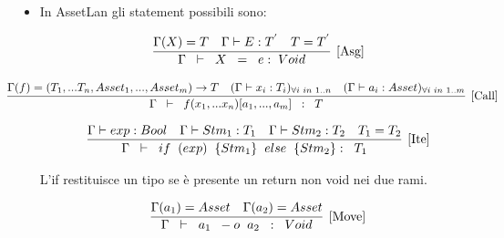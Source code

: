 \documentclass[12pt,twoside,openright,a4paper]{report}
\begin{document}
\begin{itemize}
    \item In AssetLan gli statement possibili sono:
    
    \begin{align*}
    \infer[\mathrm{[Asg]}]
    {\Gamma  \hspace{0.2cm} \vdash \hspace{0.2cm} X \hspace{0.2cm} = \hspace{0.2cm}  e : \hspace{0.1cm} Void} 
    {  \Gamma (X) = T & \Gamma \vdash E : T^{'} & T= T^{'} }
    \end{align*}

    \begin{align*}
    \hspace{-1cm}
    \infer[\mathrm{[Call]}]
    {   
    \Gamma  \hspace{0.2cm} \vdash \hspace{0.2cm} f(x_{1}, ...x_{n})[a_{1}, ..., a_{m}] \hspace{0.2cm} : \hspace{0.2cm} T} 
    {  \Gamma (f) = (T_{1},...T_{n},Asset_{1},...,Asset_{m}) \to T  & (\Gamma \vdash x_{i} : T_{i})_{\forall{i \hspace{0.1cm}in \hspace{0.1cm} 1..n}} & (\Gamma \vdash a_{i} : Asset)_{\forall{i \hspace{0.1cm} in  \hspace{0.1cm}1..m}}}
    \end{align*}
  
    \begin{align*}
    \infer[\mathrm{[Ite]}]
    {\Gamma \hspace{0.2cm} \vdash  \hspace{0.2cm}if\hspace{0.2cm} (exp)\hspace{0.2cm} \{Stm_{1}\}\hspace{0.2cm} else \hspace{0.2cm}\{Stm_{2}\} : \hspace{0.2cm}T_1 } 
    {  \Gamma \vdash exp : Bool & \Gamma \vdash Stm_{1} : T_1 & \Gamma \vdash Stm_{2} : T_2 & T_1 = T_2}
    \end{align*}
    
    L'if restituisce un tipo se è presente un return non void nei due rami.

    \begin{align*}
    \infer[\mathrm{[Move]}]
    {\Gamma \hspace{0.2cm} \vdash  \hspace{0.2cm}a_{1}\hspace{0.2cm} -o\hspace{0.2cm} a_{2} \hspace{0.2cm}: \hspace{0.2cm}Void } 
    {  \Gamma(a_{1}) = Asset & \Gamma(a_{2}) = Asset  }
    \end{align*}
    

\end{itemize}
\end{document}
